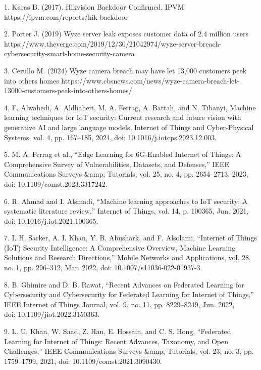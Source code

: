 \begin{noparindent}

1. Karas B. (2017). Hikvision Backdoor Confirmed. IPVM
https://ipvm.com/reports/hik-backdoor

2. Porter J. (2019) Wyze server leak exposes customer data of 2.4
million users
https://www.theverge.com/2019/12/30/21042974/wyze-server-breach-cybersecurity-smart-home-security-camera

3. Cerullo M. (2024) Wyze camera breach may have let 13,000 customers
peek into others\textquotesingle{} homes
https://www.cbsnews.com/news/wyze-camera-breach-let-13000-customers-peek-into-others-homes/

4. F. Alwahedi, A. Aldhaheri, M. A. Ferrag, A. Battah, and N. Tihanyi,
Machine learning techniques for IoT security: Current research and
future vision with generative AI and large language models, Internet of
Things and Cyber-Physical Systems, vol. 4, pp. 167--185, 2024, doi:
10.1016/j.iotcps.2023.12.003.

5. M. A. Ferrag et al., ``Edge Learning for 6G-Enabled Internet of
Things: A Comprehensive Survey of Vulnerabilities, Datasets, and
Defenses,'' IEEE Communications Surveys \&amp; Tutorials, vol. 25, no.
4, pp. 2654--2713, 2023, \\doi: 10.1109/comst.2023.3317242.

6. R. Ahmad and I. Alsmadi, ``Machine learning approaches to IoT
security: A systematic literature review,'' Internet of Things, vol. 14,
p. 100365, Jun. 2021, doi: 10.1016/j.iot.2021.100365.

7. I. H. Sarker, A. I. Khan, Y. B. Abushark, and F. Alsolami, ``Internet
of Things (IoT) Security Intelligence: A Comprehensive Overview, Machine
Learning Solutions and Research Directions,'' Mobile Networks and
Applications, vol. 28, no. 1, pp. 296--312, Mar. 2022, doi:
10.1007/s11036-022-01937-3.

8. B. Ghimire and D. B. Rawat, ``Recent Advances on Federated Learning
for Cybersecurity and Cybersecurity for Federated Learning for Internet
of Things,'' IEEE Internet of Things Journal, vol. 9, no. 11, pp.
8229--8249, Jun. 2022, \\doi: 10.1109/jiot.2022.3150363.

9. L. U. Khan, W. Saad, Z. Han, E. Hossain, and C. S. Hong, ``Federated
Learning for Internet of Things: Recent Advances, Taxonomy, and Open
Challenges,'' IEEE Communications Surveys \&amp; Tutorials, vol. 23, no.
3, pp. 1759--1799, 2021, doi: 10.1109/comst.2021.3090430.


\end{noparindent}

